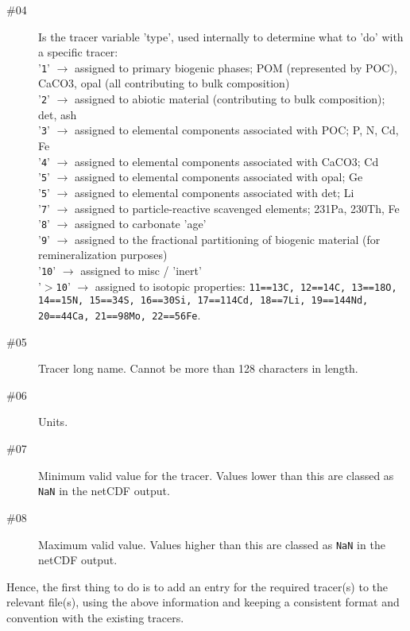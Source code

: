 \documentclass[11pt,fleqn]{book} %
\begin{document}
\begin{enumerate}
\begin{description}
\item[\#04] Is the tracer variable 'type', used internally to determine what to 'do' with a specific tracer:
    \\'\texttt{1}' \(\rightarrow\) assigned to primary biogenic phases; POM (represented by POC), CaCO3, opal (all contributing to bulk composition)
    \\'\texttt{2}' \(\rightarrow\) assigned to abiotic material (contributing to bulk composition); det, ash
    \\'\texttt{3}' \(\rightarrow\) assigned to elemental components associated with POC; P, N, Cd, Fe
    \\'\texttt{4}' \(\rightarrow\) assigned to elemental components associated with CaCO3; Cd
    \\'\texttt{5}' \(\rightarrow\) assigned to elemental components associated with opal; Ge
    \\'\texttt{5}' \(\rightarrow\) assigned to elemental components associated with det; Li
    \\'\texttt{7}' \(\rightarrow\) assigned to particle-reactive scavenged elements; 231Pa, 230Th, Fe
    \\'\texttt{8}' \(\rightarrow\) assigned to carbonate 'age'
    \\'\texttt{9}' \(\rightarrow\) assigned to the fractional partitioning of biogenic material (for remineralization purposes)
   \\'\texttt{10}' \(\rightarrow\) assigned to misc / 'inert'
\\'\texttt{\(>\)10}' \(\rightarrow\) assigned to isotopic properties: \texttt{11==13C, 12==14C, 13==18O, 14==15N, 15==34S, 16==30Si, 17==114Cd, 18==7Li, 19==144Nd, 20==44Ca, 21==98Mo, 22==56Fe}.
\item[\#05] Tracer long name. Cannot be more than 128 characters in length.
\item[\#06] Units.
\item[\#07] Minimum valid value for the tracer. Values lower than this are classed as \texttt{NaN} in the netCDF output.
\item[\#08] Maximum valid value. Values higher than this are classed as \texttt{NaN} in the netCDF output.
\end{description}
Hence, the first thing to do is to add an entry for the required tracer(s) to the relevant file(s), using the above information and keeping a consistent format and convention with the existing tracers.
 

\end{enumerate}
\end{document}
